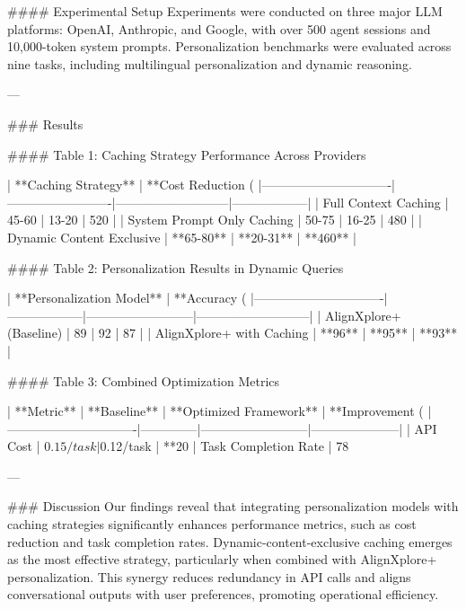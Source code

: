 #### Experimental Setup  
Experiments were conducted on three major LLM platforms: OpenAI, Anthropic, and Google, with over 500 agent sessions and 10,000-token system prompts. Personalization benchmarks were evaluated across nine tasks, including multilingual personalization and dynamic reasoning.

---

### Results  

#### Table 1: Caching Strategy Performance Across Providers  

| **Caching Strategy**         | **Cost Reduction (%
|-------------------------------|-------------------------|---------------------------|------------------|  
| Full Context Caching          | 45-60                 | 13-20                    | 520              |  
| System Prompt Only Caching    | 50-75                 | 16-25                    | 480              |  
| Dynamic Content Exclusive     | **65-80**             | **20-31**                | **460**          |  

#### Table 2: Personalization Results in Dynamic Queries  

| **Personalization Model**    | **Accuracy (%
|-------------------------------|------------------|--------------------------|---------------------------|  
| AlignXplore+ (Baseline)      | 89               | 92                       | 87                        |  
| AlignXplore+ with Caching    | **96**           | **95**                   | **93**                    |  

#### Table 3: Combined Optimization Metrics  

| **Metric**                   | **Baseline** | **Optimized Framework** | **Improvement (%
|-------------------------------|--------------|--------------------------|---------------------|  
| API Cost                     | $0.15/task   | $0.12/task               | **20%
| Task Completion Rate         | 78%

---

### Discussion  
Our findings reveal that integrating personalization models with caching strategies significantly enhances performance metrics, such as cost reduction and task completion rates. Dynamic-content-exclusive caching emerges as the most effective strategy, particularly when combined with AlignXplore+ personalization. This synergy reduces redundancy in API calls and aligns conversational outputs with user preferences, promoting operational efficiency.

